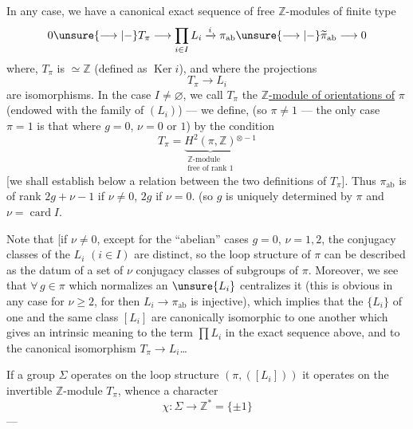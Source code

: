 In any case, we have a canonical exact sequence
of free $\mathbb Z$-modules of finite type
\[
0\unsure{\longrightarrow|-}T_\pi\longrightarrow\prod_{i\in I}L_i
\xrightarrow{i}\pi_{\mathrm{ab}}\unsure{\longrightarrow|-}\widetilde\pi_{\mathrm{ab}}\longrightarrow0
\]
where,  $T_\pi$ is $\simeq\mathbb Z$ (defined as $\operatorname{Ker}i$), and where
the projections
\[
T_\pi\longrightarrow L_i
\]
are isomorphisms. In the case $I\ne\varnothing$, we
call $T_\pi$ the \uline{$\mathbb Z$-module of orientations of}
$\pi$ (endowed with the family of $(L_i)$) ---
we define,  
(so $\pi\ne1$ --- the only case $\pi=1$ is that where
$g=0$, $\nu=0$ or $1$) by the condition
\[
T_\pi=\underbrace{H^2(\pi,\mathbb Z)}_{\substack{\mathbb Z\text{-module}\\\text{free of rank }1}}{}^{\otimes-1}
\]
[we shall establish below a relation between the
two definitions of $T_\pi$]. Thus $\pi_{\mathrm{ab}}$
is  of rank $2g+\nu-1$ if $\nu\ne0$, $2g$ if $\nu=0$.
(so $g$ is uniquely determined by $\pi$ and $\nu=\operatorname{card}I$.



Note that [if $\nu\ne0$, \inserted{and]} except for the ``abelian''
cases $g=0$, $\nu=1,2$, the conjugacy classes
of the $L_i$ $(i\in I)$ are distinct, so the
loop structure of $\pi$ can be described
as the datum of a set of $\nu$ conjugacy
classes of subgroups of $\pi$. Moreover,
we see that $\forall\,g\in\pi$ which normalizes
an $\unsure{L_i}$ centralizes it (this is obvious
in any case for $\nu\ge2$, for then
$L_i\to\pi_{\mathrm{ab}}$ is injective), which implies
that the $\{L_i\}$ of one and the same class $[L_i]$
are canonically isomorphic to one another
which gives an intrinsic meaning to the
term $\prod L_i$ in the exact sequence
above, and to the canonical isomorphism $T_\pi\to L_i$\dots
{}

If a group $\Sigma$ operates on the loop
structure $(\pi,([L_i]))$ it operates on the
invertible $\mathbb Z$-module $T_\pi$, whence a
character
\[
\chi:\Sigma\longrightarrow\mathbb Z^{*}=\{\pm1\}
\]
---

